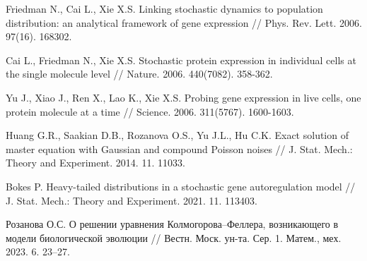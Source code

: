 \begin{thebibliography}{9} %
 Friedman N., Cai L., Xie X.S. Linking stochastic dynamics to population distribution: an analytical framework of gene expression // Phys. Rev. Lett. 2006. 97(16). 168302.

 Cai L., Friedman N., Xie X.S. Stochastic protein expression in individual cells at the single molecule level // Nature. 2006. 440(7082). 358-362.

 Yu J., Xiao J., Ren X., Lao K., Xie X.S. Probing gene expression in live cells, one protein molecule at a time // Science. 2006. 311(5767). 1600-1603.

 Huang G.R., Saakian D.B., Rozanova O.S., Yu J.L., Hu C.K. Exact solution of master equation with Gaussian
and compound Poisson noises // J. Stat. Mech.: Theory and Experiment. 2014. 11. 11033.

 Bokes P. Heavy-tailed distributions in a stochastic gene autoregulation \newline model // J. Stat. Mech.: Theory and
Experiment. 2021. 11. 113403.

 Розанова О.С. О решении уравнения Колмогорова–Феллера, возникающего в модели биологической эволюции // Вестн.
Моск. ун-та. Сер. 1. Матем., мех. 2023. 6. 23–27.

\end{thebibliography}




%
